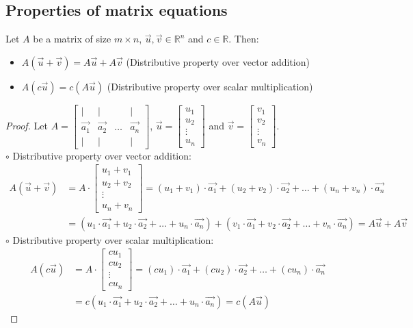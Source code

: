 \subsection{Properties of matrix equations}
\begin{theorem}
    Let $A$ be a matrix of size $m \times n$, $\vec{u}, \vec{v} \in \mathbb{R}^n$ and $c \in \mathbb{R}$. Then:
    \begin{itemize}[itemsep=1pt,label=$\circ$]
        \item $A(\vec{u} + \vec{v}) = A\vec{u} + A\vec{v}$ (Distributive property over vector addition)
        \item $A(c \vec{u}) = c(A\vec{u})$ (Distributive property over scalar multiplication)
    \end{itemize}
\end{theorem}
\begin{proof}
    Let $A = \begin{bmatrix} | & | & & | \\ \vec{a_1} & \vec{a_2} & \ldots & \vec{a_n} \\ | & | & & | \end{bmatrix}$, $\vec{u} = \begin{bmatrix} u_1 \\ u_2 \\ \vdots \\ u_n \end{bmatrix}$ and $\vec{v} = \begin{bmatrix} v_1 \\ v_2 \\ \vdots \\ v_n \end{bmatrix}$. \\
    $\circ$ Distributive property over vector addition:
    \begin{align*}
        A(\vec{u} + \vec{v}) &= A \cdot \begin{bmatrix} u_1 + v_1 \\ u_2 + v_2 \\ \vdots \\ u_n + v_n \end{bmatrix} = (u_1 + v_1) \cdot \vec{a_1} + (u_2 + v_2) \cdot \vec{a_2} + \ldots + (u_n + v_n) \cdot \vec{a_n} \\
        &= (u_1 \cdot \vec{a_1} + u_2 \cdot \vec{a_2} + \ldots + u_n \cdot \vec{a_n}) + (v_1 \cdot \vec{a_1} + v_2 \cdot \vec{a_2} + \ldots + v_n \cdot \vec{a_n}) = A\vec{u} + A\vec{v}
    \end{align*}
    $\circ$ Distributive property over scalar multiplication:
    \begin{align*}
        A(c \vec{u}) &= A \cdot \begin{bmatrix} c u_1 \\ c u_2 \\ \vdots \\ c u_n \end{bmatrix} = (c u_1) \cdot \vec{a_1} + (c u_2) \cdot \vec{a_2} + \ldots + (c u_n) \cdot \vec{a_n} \\
        &= c (u_1 \cdot \vec{a_1} + u_2 \cdot \vec{a_2} + \ldots + u_n \cdot \vec{a_n}) = c(A\vec{u})
    \end{align*}
\end{proof}

